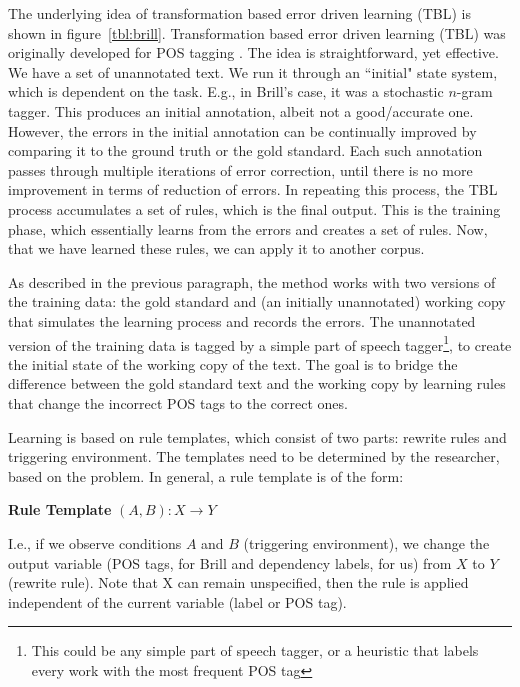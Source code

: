 The underlying idea of transformation based error driven learning (TBL) is shown in figure~\ref{tbl:brill}. Transformation based error driven learning (TBL) was originally developed for POS tagging \cite{brill1992simple,Brill:1995:TEL:218355.218367}. The idea is straightforward, yet effective. We have a set of unannotated text. We run it through an ``initial" state system, which is dependent on the task. E.g., in Brill's case, it was a stochastic $n$-gram tagger. This produces an initial annotation, albeit not a good/accurate one. However, the errors in the initial annotation can be continually improved by comparing it to the ground truth or the gold standard. Each such annotation passes through multiple iterations of error correction, until there is no more improvement in terms of reduction of errors. In repeating this process, the TBL process accumulates a set of rules, which is the final output. This is the training phase, which essentially learns from the errors and creates a set of rules. Now, that we have learned these rules, we can apply it to another corpus. 

As described in the previous paragraph, the method works with two versions of the training data: the gold standard and (an initially unannotated) working copy that simulates the learning process and records the errors. The unannotated version of the training data is tagged by a simple part of speech tagger\footnote{This could be any simple part of speech tagger, or a heuristic that labels every work with the most frequent POS tag}, to create the initial state of the working copy of the text.  The goal is to bridge the difference between the gold standard text and the working copy by learning rules that change the incorrect POS tags to the correct ones. 

Learning is based on rule templates, which consist of two parts: rewrite rules and triggering environment. The templates need to be determined by the researcher, based on the problem. In general, a rule template is of the form:


\textbf{Rule Template} ${(A, B): X \rightarrow Y} $

I.e., if we observe conditions $A$ and $B$ (triggering environment), we change the output variable (POS tags, for Brill and dependency labels, for us) 
from $X$ to $Y$ (rewrite rule). Note that X can remain unspecified, then the rule is applied independent of the current variable (label or POS tag).

